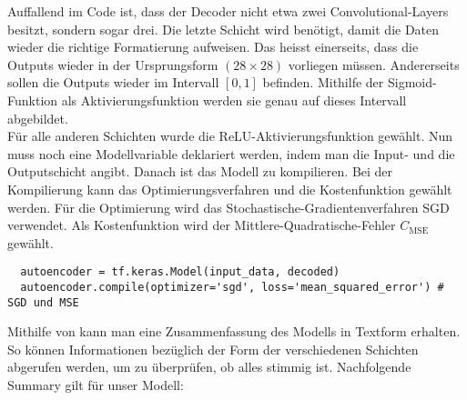 Auffallend im Code ist, dass der Decoder nicht etwa zwei Convolutional-Layers
besitzt, sondern sogar drei. Die letzte Schicht wird benötigt, damit
die Daten wieder die richtige Formatierung aufweisen. Das heisst einerseits,
dass die Outputs wieder in der Ursprungsform $(28 \times 28)$ vorliegen müssen.
Andererseits sollen die Outputs wieder im Intervall
$[0,1]$ befinden. Mithilfe der Sigmoid-Funktion als Aktivierungsfunktion werden
sie genau auf dieses Intervall abgebildet. \\
Für alle anderen Schichten wurde die ReLU-Aktivierungsfunktion gewählt.
\para{}
Nun muss noch eine Modellvariable deklariert werden, indem man die Input-  und
die Outputschicht  angibt.
Danach ist das Modell zu kompilieren. Bei der Kompilierung kann das
Optimierungsverfahren und die Kostenfunktion gewählt werden. Für die Optimierung
wird das Stochastische-Gradientenverfahren SGD verwendet.
Als Kostenfunktion wird der Mittlere-Quadratische-Fehler $C_{\text{MSE}}$ gewählt.
\begin{verbatim}
  autoencoder = tf.keras.Model(input_data, decoded)
  autoencoder.compile(optimizer='sgd', loss='mean_squared_error') # SGD und MSE
\end{verbatim}
Mithilfe von  kann man eine Zusammenfassung des
Modells in Textform erhalten. So können Informationen bezüglich der Form der
verschiedenen Schichten abgerufen werden, um zu überprüfen, ob alles stimmig ist.
Nachfolgende Summary gilt für unser Modell:
